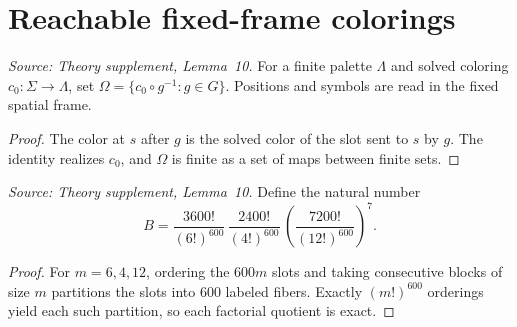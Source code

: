 \section{Reachable fixed-frame colorings}

\begin{definition}
  \label{def:reachable-colorings}
  \leanok
  \textit{Source: Theory supplement, Lemma~10.}
  For a finite palette \(\Lambda\) and solved coloring
  \(c_0\colon\Sigma\to\Lambda\), set
  \(\Omega=\{c_0\circ g^{-1}:g\in G\}\). Positions and symbols are
  read in the fixed spatial frame.
\end{definition}
\begin{proof}
  \leanok
  The color at \(s\) after \(g\) is the solved color of the slot sent
  to \(s\) by \(g\). The identity realizes \(c_0\), and \(\Omega\) is
  finite as a set of maps between finite sets.
\end{proof}

\begin{definition}
  \label{def:balanced-color-count}
  \leanok
  \textit{Source: Theory supplement, Lemma~10.}
  Define the natural number
  \[
    B=\frac{3600!}{(6!)^{600}}\,
      \frac{2400!}{(4!)^{600}}\,
      \left(\frac{7200!}{(12!)^{600}}\right)^7.
  \]
\end{definition}
\begin{proof}
  \leanok
  For \(m=6,4,12\), ordering the \(600m\) slots and taking consecutive
  blocks of size \(m\) partitions the slots into \(600\) labeled
  fibers. Exactly \((m!)^{600}\) orderings yield each such partition,
  so each factorial quotient is exact.
\end{proof}

